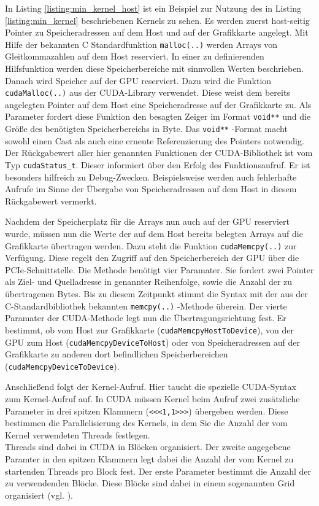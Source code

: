 \documentclass[../main.tex]{subfiles}
\begin{document}
In Listing \ref{listing:min_kernel_host} ist ein Beispiel zur Nutzung des in Listing \ref{listing:min_kernel} beschriebenen Kernels zu sehen. Es werden zuerst host-seitig Pointer zu Speicheradressen auf dem Host und auf der Grafikkarte angelegt. Mit Hilfe der bekannten C Standardfunktion \texttt{malloc(..)} werden Arrays von Gleitkommazahlen auf dem Host reserviert. In einer zu definierenden Hilfsfunktion werden diese Speicherbereiche mit sinnvollen Werten beschrieben. Danach wird Speicher auf der GPU reserviert. Dazu wird die Funktion \texttt{cudaMalloc(..)} aus der CUDA-Library verwendet. Diese weist dem bereits angelegten Pointer auf dem Host eine Speicheradresse auf der Grafikkarte zu. Als Parameter fordert diese Funktion den besagten Zeiger im Format \texttt{void**} und die Größe des benötigten Speicherbereichs in Byte. Das \texttt{void**} -Format macht sowohl einen Cast als auch eine erneute Referenzierung des Pointers notwendig. \\ Der Rückgabewert aller hier genannten Funktionen der CUDA-Bibliothek ist vom Typ \texttt{cudaStatus\_t}. Dieser informiert über den Erfolg des Funktionsaufruf. Er ist besonders hilfreich zu Debug-Zwecken. Beispielsweise werden auch fehlerhafte Aufrufe im Sinne der Übergabe von Speicheradressen auf dem Host in diesem Rückgabewert vermerkt. \par Nachdem der Speicherplatz für die Arrays nun auch auf der GPU reserviert wurde, müssen nun die Werte der auf dem Host bereits belegten Arrays auf die Grafikkarte übertragen werden. Dazu steht die Funktion \texttt{cudaMemcpy(..)} zur Verfügung. Diese regelt den Zugriff auf den Speicherbereich der GPU über die PCIe-Schnittstelle. Die Methode benötigt vier Paramater. Sie fordert zwei Pointer als Ziel- und Quelladresse in genannter Reihenfolge, sowie die Anzahl der zu übertragenen Bytes. Bis zu diesem Zeitpunkt stimmt die Syntax mit der aus der C-Standardbibliothek bekannten \texttt{memcpy(..)} -Methode überein. Der vierte Paramater der CUDA-Methode legt nun die Übertragungsrichtung fest. Er bestimmt, ob vom Host zur Grafikkarte (\texttt{cudaMemcpyHostToDevice}), von der GPU zum Host (\texttt{cudaMemcpyDeviceToHost}) oder von Speicheradressen auf der Grafikkarte zu anderen dort befindlichen Speicherbereichen (\texttt{cudaMemcpyDeviceToDevice}). \par Anschließend folgt der Kernel-Aufruf. Hier taucht die spezielle CUDA-Syntax zum Kernel-Aufruf auf. In CUDA müssen Kernel beim Aufruf zwei zusätzliche Parameter in drei spitzen Klammern (\texttt{<<<1,1>>>}) übergeben werden. Diese bestimmen die Parallelisierung des Kernels, in dem Sie die Anzahl der vom Kernel verwendeten Threads festlegen. \\ Threads sind dabei in CUDA in Blöcken organisiert. Der zweite angegebene Paramter in den spitzen Klammern legt dabei die Anzahl der vom Kernel zu startenden Threads pro Block fest. Der erste Parameter bestimmt die Anzahl der zu verwendenden Blöcke. Diese Blöcke sind dabei in einem sogenannten Grid organisiert (vgl. \cite{CUDA_GUIDE}). \par 
\end{document}
